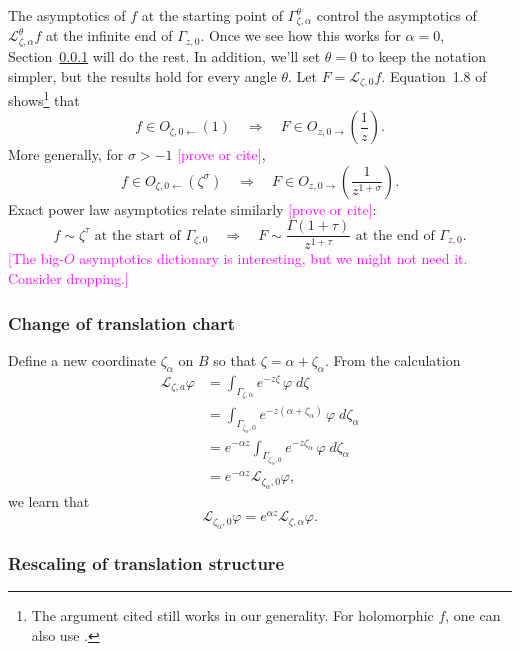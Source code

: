 \documentclass{article}
\theoremstyle{definition}
\newcommand{\laplace}{\mathcal{L}}
\begin{document}
The asymptotics of $f$ at the starting point of $\Gamma_{\zeta, \alpha}^\theta$ control the asymptotics of $\laplace_{\zeta, \alpha}^\theta f$ at the infinite end of $\Gamma_{z, 0}$. Once we see how this works for $\alpha = 0$, Section~\ref{translation} will do the rest. In addition, we'll set $\theta=0$ to keep the notation simpler, but the results hold for every angle $\theta$. Let $F = \laplace_{\zeta, 0} f$. Equation~1.8 of \cite{laplace-tfm} shows\footnote{The argument cited still works in our generality. For holomorphic $f$, one can also use \cite[Equation 1.5]{sternin1995borel}.} that
\[ f \in O_{\zeta, 0 \leftarrow}(1) \quad\Longrightarrow\quad F \in O_{z, 0 \rightarrow}\left(\frac{1}{z}\right). \]
More generally, for $\sigma > -1$ \textcolor{magenta}{[prove or cite]},
\[ f \in O_{\zeta, 0 \leftarrow}(\zeta^\sigma) \quad\Longrightarrow\quad F \in O_{z, 0 \rightarrow}\left(\frac{1}{z^{1 + \sigma}}\right). \]
Exact power law asymptotics relate similarly \textcolor{magenta}{[prove or cite]}:
\[ f \sim \zeta^\tau \text{ at the start of } \Gamma_{\zeta, 0} \quad\Longrightarrow\quad F \sim \frac{\Gamma(1+\tau)}{z^{1+\tau}} \text{ at the end of } \Gamma_{z, 0}. \]
\textcolor{magenta}{[The big-$O$ asymptotics dictionary is interesting, but we might not need it. Consider dropping.]}


\subsubsection{Change of translation chart}\label{translation}
Define a new coordinate $\zeta_\alpha$ on $B$ so that $\zeta = \alpha + \zeta_\alpha$. From the calculation
\begin{align*}
\laplace_{\zeta, a} \varphi & = \int_{\Gamma_{\zeta, \alpha}} e^{-z \zeta}\,\varphi\;d\zeta \\
& = \int_{\Gamma_{\zeta_\alpha, 0}} e^{-z(\alpha + \zeta_\alpha)}\,\varphi\;d\zeta_\alpha \\
& = e^{-\alpha z} \int_{\Gamma_{\zeta_\alpha, 0}} e^{-z\zeta_\alpha}\,\varphi\;d\zeta_\alpha \\
& = e^{-\alpha z} \laplace_{\zeta_\alpha, 0} \varphi,
\end{align*}
we learn that
\begin{equation}
    \label{change-chart}
    \laplace_{\zeta_\alpha, 0} \varphi = e^{\alpha z} \laplace_{\zeta, \alpha} \varphi.
\end{equation}

\subsubsection{Rescaling of translation structure}
\end{document}
